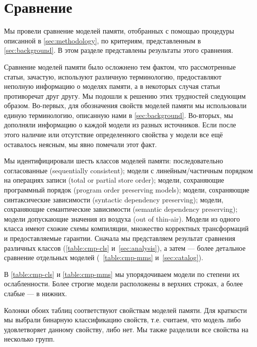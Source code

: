 \section{Сравнение}
\label{sec:comparison}

Мы провели сравнение моделей памяти, 
отобранных с помощью процедуры описанной в \cref{sec:methodology},
по критериям, представленным в \cref{sec:background}. В этом разделе представлены результаты этого сравнения.

Сравнение моделей памяти было 
осложнено тем фактом, что рассмотренные 
статьи, зачастую, используют различную терминологию, 
предоставляют неполную информацию о моделях памяти, а в некоторых случая статьи  
 противоречат друг другу. 
Мы подошли к решению этих трудностей следующим образом. 
Во-первых, для обозначения свойств моделей памяти
мы использовали единую терминологию,
описанную нами в \cref{sec:background}.
Во-вторых, мы дополняли информацию о каждой модели 
из разных источников. Если после этого 
наличие или отсутствие определенного свойства у модели 
все ещё оставалось неясным, мы явно помечали этот факт. 

Мы идентифицировали шесть классов моделей памяти:
последовательно согласованные (sequentially consistent); 
модели с линейным/частичным порядком на операциях записи
(total or partial store order);
модели, сохраняющие программный порядок
(program order preserving models); 
модели, сохраняющие синтаксические зависимости 
(syntactic dependency preserving);
модели, сохраняющие семантические зависимости
(semantic dependency preserving);
модели допускающие значения из воздуха
(out of thin-air). 
Модели из одного класса имеют схожие схемы компиляции, 
множество корректных трансформаций и предоставляемые гарантии. 
Сначала мы представляем результат сравнения различных классов 
(\cref{table:cmp-cls} и~\cref{sec:analysis}),
а затем --- более детальное сравнение отдельных моделей 
(~\cref{table:cmp-mms} и~\cref{sec:catalog}).



В \cref{table:cmp-cls} и \cref{table:cmp-mms} 
мы упорядочиваем модели по степени их ослабленности. 
Более строгие модели расположены в верхних строках, 
а более слабые --- в нижних.  

Колонки обоих таблиц соответствуют свойствам моделей памяти.
Для краткости мы выбрали бинарную классификацию свойств,
т.е. считаем, что модель либо удовлетворяет данному свойству, либо нет. 
Мы также разделили все свойства на несколько групп. 


